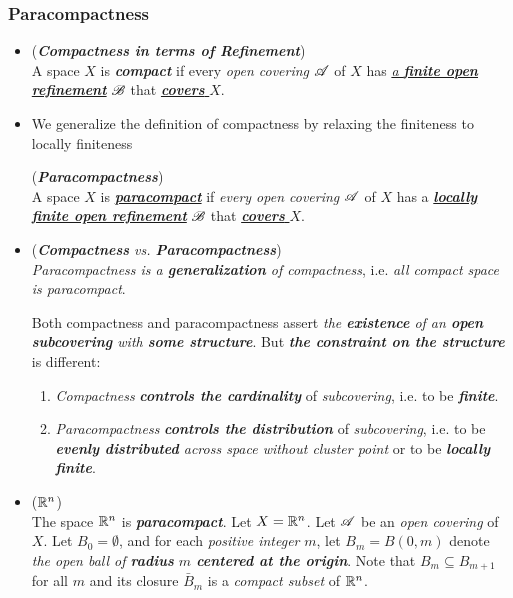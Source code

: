 \documentclass[11pt]{article}
\begin{document}
\subsubsection{Paracompactness}
\begin{itemize}
\item \begin{definition} (\emph{\textbf{Compactness in terms of Refinement}})\\
A space $X$ is \emph{\textbf{compact}} if every \emph{open covering} ${\mathscr A}$ of $X$ has \underline{\emph{a \textbf{finite open refinement}}} ${\mathscr B}$ that \underline{\emph{\textbf{covers}} $X$}.
\end{definition}

\item We generalize the definition of compactness by relaxing the finiteness to locally finiteness
\begin{definition}  (\emph{\textbf{Paracompactness}})\\
A space $X$ is  \underline{\emph{\textbf{paracompact}}} if \emph{every open covering} ${\mathscr A}$ of $X$ has a \underline{\emph{\textbf{locally finite open refinement}}} ${\mathscr B}$ that \underline{\emph{\textbf{covers}} $X$}.
\end{definition}

\item \begin{remark} (\emph{\textbf{Compactness} vs. \textbf{Paracompactness}})\\
\emph{Paracompactness is a \textbf{generalization} of compactness}, i.e. \emph{all compact space is paracompact}. 

Both compactness and paracompactness assert \emph{the \textbf{existence} of an \textbf{open subcovering} with \textbf{some structure}}. But \emph{\textbf{the constraint on the structure}} is different:
\begin{enumerate}
\item \emph{Compactness} \emph{\textbf{controls the cardinality}} of \emph{subcovering}, i.e. to be \emph{\textbf{finite}}.
\item \emph{Paracompactness} \emph{\textbf{controls the distribution}} of \emph{subcovering}, i.e. to be \emph{\textbf{evenly distributed} across space without cluster point} or to be \emph{\textbf{locally finite}}.
\end{enumerate}
\end{remark}

\item \begin{example} (\textbf{\emph{${\mathbb R}^n$}}) \\
The space ${\mathbb R}^n$ is \emph{\textbf{paracompact}}. Let $X = {\mathbb R}^n$. Let ${\mathscr A}$ be an \emph{open covering} of $X$. Let $B_0 = \emptyset$, and for each \emph{positive integer} $m$, let $B_m= B(0, m)$ denote \emph{the open ball of \textbf{radius} $m$ \textbf{centered at the origin}}. Note that $B_m \subseteq B_{m+1}$ for all $m$ and its closure $\bar{B}_m$ is a \emph{compact subset} of ${\mathbb R}^n$.
 

\end{example}
\end{itemize}
\end{document}
